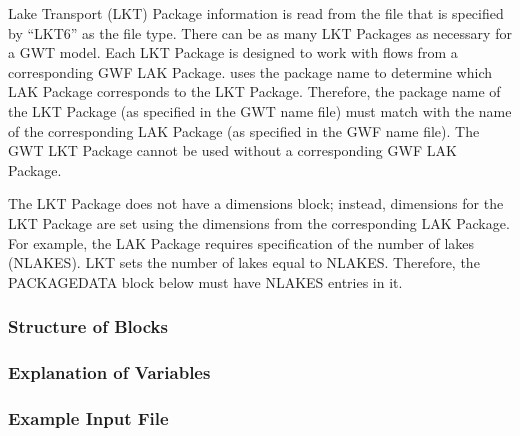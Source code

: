 Lake Transport (LKT) Package information is read from the file that is specified by ``LKT6'' as the file type.  There can be as many LKT Packages as necessary for a GWT model. Each LKT Package is designed to work with flows from a corresponding GWF LAK Package. \mf uses the package name to determine which LAK Package corresponds to the LKT Package.  Therefore, the package name of the LKT Package (as specified in the GWT name file) must match with the name of the corresponding LAK Package (as specified in the GWF name file).  The GWT LKT Package cannot be used without a corresponding GWF LAK Package.

The LKT Package does not have a dimensions block; instead, dimensions for the LKT Package are set using the dimensions from the corresponding LAK Package.  For example, the LAK Package requires specification of the number of lakes (NLAKES).  LKT sets the number of lakes equal to NLAKES.  Therefore, the PACKAGEDATA block below must have NLAKES entries in it.

\vspace{5mm}
\subsubsection{Structure of Blocks}




\vspace{5mm}
\subsubsection{Explanation of Variables}
\begin{description}

\end{description}

\vspace{5mm}
\subsubsection{Example Input File}


\vspace{5mm}
